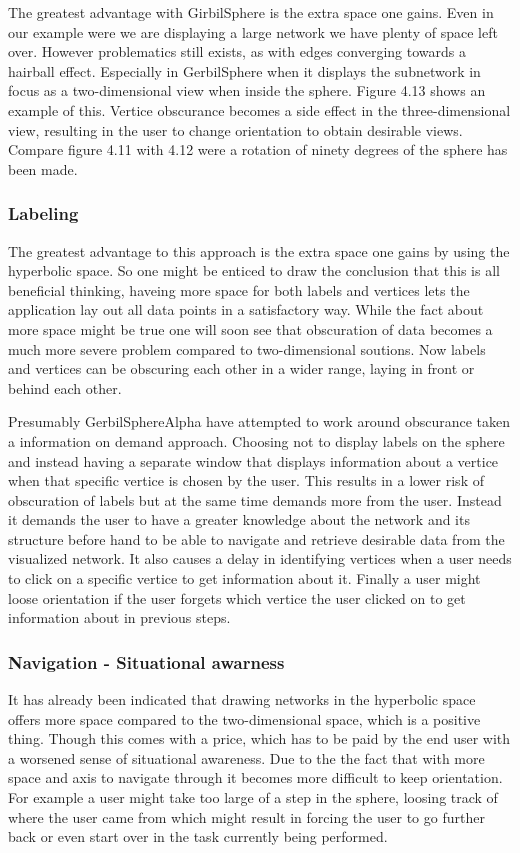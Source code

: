 \documentclass[a4paper,11pt]{kth-mag}
\begin{document}
The greatest advantage with GirbilSphere is the extra space one gains. Even in our example were we are displaying a large network we have plenty of space left over. However problematics still exists, 
as with edges converging towards a hairball effect. Especially in GerbilSphere when it displays the subnetwork in focus as a two-dimensional view when inside the sphere. Figure 4.13 shows an example of this. 
Vertice obscurance becomes a side effect in the three-dimensional view, resulting in the user to change orientation to obtain desirable views. Compare figure 4.11 with 4.12 were a rotation of ninety degrees of 
the sphere has been made.
\subsubsection{Labeling}
The greatest advantage to this approach is the extra space one gains by using the hyperbolic space. So one might be enticed to draw the conclusion that this is all beneficial thinking,
haveing more space for both labels and vertices lets the application lay out all data points in a satisfactory way. While the fact about more space might be true one will soon see that
obscuration of data becomes a much more severe problem compared to two-dimensional soutions. Now labels and vertices can be obscuring each other in a wider range, laying in front or behind each other.
 
Presumably GerbilSphereAlpha have attempted to work around obscurance taken a information on demand approach. Choosing not to display labels on the
sphere and instead having a separate window that displays information about a vertice when that specific vertice is chosen by the user.
This results in a lower risk of obscuration of labels but at the same time demands more from the user. Instead it demands the user to have a greater 
knowledge about the network and its structure before hand to be able to navigate and retrieve desirable data from the visualized network. It also causes a delay in identifying 
vertices when a user needs to click on a specific vertice to get information about it. Finally a user might loose orientation
if the user forgets which vertice the user clicked on to get information about in previous steps.
\subsubsection{Navigation - Situational awarness}
It has already been indicated that drawing networks in the hyperbolic space offers more space compared to the
two-dimensional space, which is a positive thing. Though this comes with a price, which has to be paid by the end user with a
worsened sense of situational awareness. Due to the the fact that with more space and axis to navigate through it becomes more difficult to keep orientation.
For example a user might take too large of a step in the sphere, loosing track of where the user came from which might result in forcing the user to go further back
or even start over in the task currently being performed.
\end{document}
